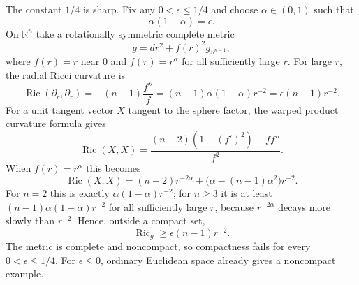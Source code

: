 \begin{solution}
The constant $1/4$ is sharp. Fix any $0<\epsilon\leq 1/4$ and choose
$\alpha\in(0,1)$ such that
\[
    \alpha(1-\alpha)=\epsilon.
\]
On $\mathbb{R}^n$ take a rotationally symmetric complete metric
\[
    g=dr^2+f(r)^2g_{S^{n-1}},
\]
where $f(r)=r$ near $0$ and $f(r)=r^{\alpha}$ for all sufficiently large $r$.
For large $r$, the radial Ricci curvature is
\[
    \operatorname{Ric}(\partial_r,\partial_r)
    =
    -(n-1)\frac{f''}{f}
    =
    (n-1)\alpha(1-\alpha)r^{-2}
    =
    \epsilon(n-1)r^{-2}.
\]
For a unit tangent vector $X$ tangent to the sphere factor, the warped product
curvature formula gives
\[
    \operatorname{Ric}(X,X)
    =
    \frac{(n-2)(1-(f')^2)-ff''}{f^2}.
\]
When $f(r)=r^{\alpha}$ this becomes
\[
    \operatorname{Ric}(X,X)
    =
    (n-2)r^{-2\alpha}
    +
    \bigl(\alpha-(n-1)\alpha^2\bigr)r^{-2}.
\]
For $n=2$ this is exactly $\alpha(1-\alpha)r^{-2}$; for $n\geq 3$ it is at least
$(n-1)\alpha(1-\alpha)r^{-2}$ for all sufficiently large $r$, because
$r^{-2\alpha}$ decays more slowly than $r^{-2}$. Hence, outside a compact set,
\[
    \operatorname{Ric}_g\geq \epsilon(n-1)r^{-2}.
\]
The metric is complete and noncompact, so compactness fails for every
$0<\epsilon\leq 1/4$. For $\epsilon\leq 0$, ordinary Euclidean space already gives
a noncompact example.
\end{solution}
